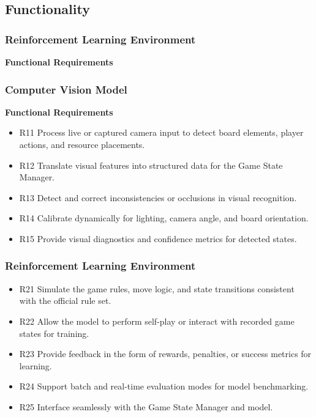 \documentclass{article}
\begin{document}
\subsection{Functionality}\label{subsec:functionality}

\subsubsection{Reinforcement Learning Environment}

\textbf{Functional Requirements}



\subsubsection{Computer Vision Model}

\textbf{Functional Requirements}

\begin{itemize}
  \item R11 Process live or captured camera input to detect board elements, player actions, and resource placements.
  \item R12 Translate visual features into structured \GameState{} data for the Game State Manager.
  \item R13 Detect and correct inconsistencies or occlusions in visual recognition.
  \item R14 Calibrate dynamically for lighting, camera angle, and board orientation.
  \item R15 Provide visual diagnostics and confidence metrics for detected states.
\end{itemize}

\subsubsection{Reinforcement Learning Environment}

\begin{itemize}
  \item R21 Simulate the game rules, move logic, and state transitions consistent with the official \emph{\Catan{}} rule set.
  \item R22 Allow the \AI{} model to perform self-play or interact with recorded game states for training.
  \item R23 Provide feedback in the form of rewards, penalties, or success metrics for learning.
  \item R24 Support batch and real-time evaluation modes for model benchmarking.
  \item R25 Interface seamlessly with the Game State Manager and \AI{} model.
\end{itemize}
\end{document}
